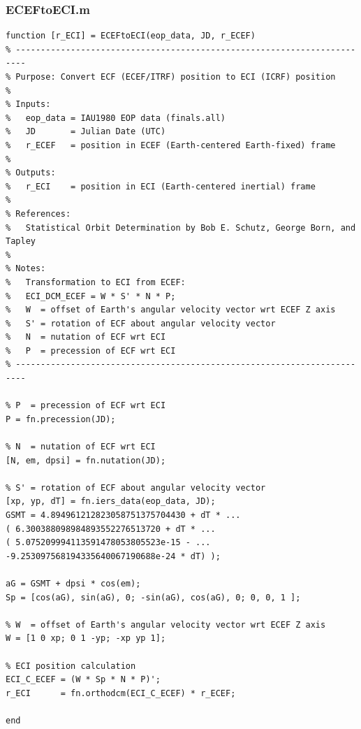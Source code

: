 \documentclass[conf]{new-aiaa}
\begin{document}
\subsubsection{ECEFtoECI.m}

\begin{lstlisting}
function [r_ECI] = ECEFtoECI(eop_data, JD, r_ECEF)
% ------------------------------------------------------------------------ 
% Purpose: Convert ECF (ECEF/ITRF) position to ECI (ICRF) position 
% 
% Inputs: 
%   eop_data = IAU1980 EOP data (finals.all)
%   JD       = Julian Date (UTC) 
%   r_ECEF   = position in ECEF (Earth-centered Earth-fixed) frame
% 
% Outputs: 
%   r_ECI    = position in ECI (Earth-centered inertial) frame 
% 
% References: 
%   Statistical Orbit Determination by Bob E. Schutz, George Born, and Tapley
% 
% Notes: 
%   Transformation to ECI from ECEF: 
%   ECI_DCM_ECEF = W * S' * N * P; 
%   W  = offset of Earth's angular velocity vector wrt ECEF Z axis 
%   S' = rotation of ECF about angular velocity vector 
%   N  = nutation of ECF wrt ECI 
%   P  = precession of ECF wrt ECI 
% ------------------------------------------------------------------------ 

% P  = precession of ECF wrt ECI 
P = fn.precession(JD); 

% N  = nutation of ECF wrt ECI  
[N, em, dpsi] = fn.nutation(JD); 

% S' = rotation of ECF about angular velocity vector 
[xp, yp, dT] = fn.iers_data(eop_data, JD); 
GSMT = 4.894961212823058751375704430 + dT * ... 
( 6.300388098984893552276513720 + dT * ... 
( 5.075209994113591478053805523e-15 - ... 
-9.253097568194335640067190688e-24 * dT) ); 

aG = GSMT + dpsi * cos(em); 
Sp = [cos(aG), sin(aG), 0; -sin(aG), cos(aG), 0; 0, 0, 1 ]; 

% W  = offset of Earth's angular velocity vector wrt ECEF Z axis 
W = [1 0 xp; 0 1 -yp; -xp yp 1]; 

% ECI position calculation 
ECI_C_ECEF = (W * Sp * N * P)'; 
r_ECI      = fn.orthodcm(ECI_C_ECEF) * r_ECEF; 

end 
\end{lstlisting}
\end{document}
